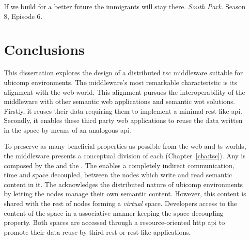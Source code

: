 
\begin{savequote}[50mm]
If we build for a better future the immigrants will stay there.
\emph{South Park}. Season 8, Episode 6.
\end{savequote}


\chapter{Conclusions}
\label{cha:conclusions}


\ifpdf
    \graphicspath{{\pathchapseven/figures/PNG/}{\pathchapseven/figures/PDF/}{\pathchapseven/figures/}}
\else
    \graphicspath{{\pathchapseven/figures/EPS/}{\pathchapseven/figures/}}
\fi




This dissertation explores the design of a distributed \ac{tsc} middleware suitable for \ac{ubicomp} environments.
The middleware's most remarkable characteristic is its alignment with the web world.
This alignment pursues the interoperability of the middleware with other semantic web applications and semantic \ac{wot} solutions.
Firstly, it reuses their data requiring them to implement a minimal \ac{rest}-like \ac{api}.
Secondly, it enables these third party web applications to reuse the data written in the space by means of an analogous \ac{api}. %


To preserve as many beneficial properties as possible from the web and \ac{ts} worlds, the middleware presents a conceptual division of each \Space{} (Chapter~\ref{cha:tsc}).
Any \Space{} is composed by the \coordspace{} and the \outerspace{}.
The \coordspace{} enables a completely indirect communication, time and space decoupled, between the nodes which write and read semantic content in it.
The \outerspace{} acknowledges the distributed nature of \ac{ubicomp} environments by letting the nodes manage their own semantic content.
However, this content is shared with the rest of nodes forming a \emph{virtual} space.
Developers access to the content of the space in a associative manner keeping the space decoupling property.
Both spaces are accessed through a resource-oriented \ac{http} \ac{api} to promote their data reuse by third \ac{rest} or \ac{rest}-like applications.


